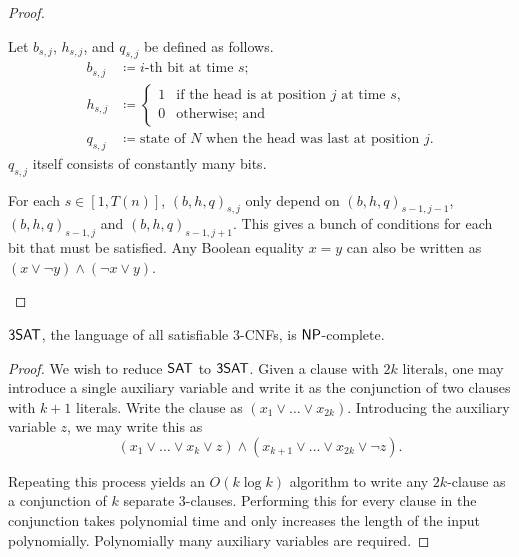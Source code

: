 \begin{proof}
\begin{subproof}
        Let $b_{s,j}$, $h_{s,j}$, and $q_{s,j}$ be defined as follows.
        \begin{align*}
            b_{s,j} &\coloneq i\text{-th bit at time } s; \\
            h_{s,j} &\coloneq \begin{cases}
                1 & \text{if the head is at position } j \text{ at time } s, \\
                0 & \text{otherwise; and}
            \end{cases} \\
            q_{s,j} &\coloneq \text{state of } N \text{ when the head was last at position } j.
        \end{align*}
        $q_{s,j}$ itself consists of constantly many bits.

        For each $s \in [1, T(n)]$, $(b, h, q)_{s,j}$ only depend on
        $(b, h, q)_{s-1,j-1}$, $(b, h, q)_{s-1,j}$ and
        $(b, h, q)_{s-1,j+1}$.
        This gives a bunch of conditions for each bit that must be
        satisfied.
        Any Boolean equality $x = y$ can also be written as
        $(x \lor \neg y) \land (\neg x \lor y)$.
    \end{subproof}
\end{proof}

\begin{theorem}
    $\mathsf{3SAT}$, the language of all satisfiable $3$-CNFs, is $\mathsf{NP}$-complete.
\end{theorem}
\begin{proof}
    We wish to reduce $\mathsf{SAT}$ to $\mathsf{3SAT}$.
    Given a clause with $2k$ literals, one may introduce a single auxiliary
    variable and write it as the conjunction of two clauses with $k + 1$
    literals.
    Write the clause as $(x_1 \lor \dots \lor x_{2k})$.
    Introducing the auxiliary variable $z$, we may write this as \[
        (x_1 \lor \dots \lor x_k \lor z) \land
            (x_{k+1} \lor \dots \lor x_{2k} \lor \neg z).
    \]

    Repeating this process yields an $O(k \log k)$ algorithm to write any
    $2k$-clause as a conjunction of $k$ separate $3$-clauses.
    Performing this for every clause in the conjunction takes polynomial
    time and only increases the length of the input polynomially.
    Polynomially many auxiliary variables are required.
\end{proof}
